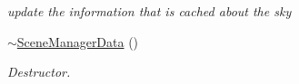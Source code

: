 \begin{DoxyCompactItemize}
\begin{DoxyCompactList}\small\item\em update the information that is cached about the sky \item\end{DoxyCompactList}\item 
\hypertarget{classMezzanine_1_1internal_1_1SceneManagerData_a0ed3e209d22dd68db12aa9b4d736a5b5}{
\hyperlink{classMezzanine_1_1internal_1_1SceneManagerData_a0ed3e209d22dd68db12aa9b4d736a5b5}{$\sim$SceneManagerData} ()}
\label{classMezzanine_1_1internal_1_1SceneManagerData_a0ed3e209d22dd68db12aa9b4d736a5b5}

\begin{DoxyCompactList}\small\item\em Destructor. \item\end{DoxyCompactList}\end{DoxyCompactItemize}
